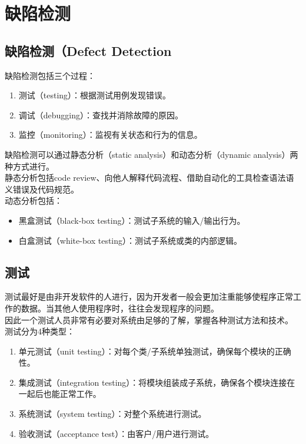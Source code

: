\newpage

\section{缺陷检测}

\subsection{缺陷检测（Defect Detection}

缺陷检测包括三个过程：

\begin{enumerate}
    \item 测试（testing）：根据测试用例发现错误。
    \item 调试（debugging）：查找并消除故障的原因。
    \item 监控（monitoring）：监视有关状态和行为的信息。
\end{enumerate}

缺陷检测可以通过静态分析（static analysis）和动态分析（dynamic analysis）两种方式进行。\\

静态分析包括code review、向他人解释代码流程、借助自动化的工具检查语法语义错误及代码规范。\\

动态分析包括：

\begin{itemize}
    \item 黑盒测试（black-box testing）：测试子系统的输入/输出行为。
    \item 白盒测试（white-box testing）：测试子系统或类的内部逻辑。
\end{itemize}

\vspace{0.5cm}

\subsection{测试}

测试最好是由非开发软件的人进行，因为开发者一般会更加注重能够使程序正常工作的数据。当其他人使用程序时，往往会发现程序的问题。\\

因此一个测试人员非常有必要对系统由足够的了解，掌握各种测试方法和技术。\\

测试分为4种类型：

\begin{enumerate}
    \item 单元测试（unit testing）：对每个类/子系统单独测试，确保每个模块的正确性。

    \item 集成测试（integration testing）：将模块组装成子系统，确保各个模块连接在一起后也能正常工作。

    \item 系统测试（system testing）：对整个系统进行测试。

    \item 验收测试（acceptance test）：由客户/用户进行测试。
\end{enumerate}

\newpage